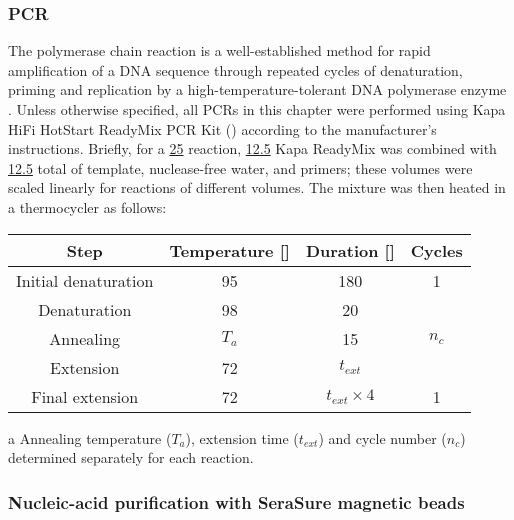\subsubsection{PCR}
\label{sec:methods_molec_standard_pcr}

The polymerase chain reaction is a well-established method for rapid amplification of a DNA sequence through repeated cycles of denaturation, priming and replication by a high-temperature-tolerant DNA polymerase enzyme \parencite{paul2010hotstartpcr}. Unless otherwise specified, all PCRs in this chapter were performed using  Kapa HiFi HotStart ReadyMix PCR Kit () according to the manufacturer's instructions. Briefly, for a \ul{25} reaction, \ul{12.5} Kapa ReadyMix was combined with \ul{12.5} total of template, nuclease-free water, and primers; these volumes were scaled linearly for reactions of different volumes. The mixture was then heated in a thermocycler as follows:

\begin{center}
\begin{threeparttable}
\begin{tabular}{cccc}\toprule
\textbf{Step} & \textbf{Temperature [\degC{}]} & \textbf{Duration [\secs{}]} & \textbf{Cycles}\\\midrule
Initial denaturation & 95 & 180 & 1 \\\midrule
Denaturation & 98 & 20 & \multirow{3}{*}{$n_c$\tnote{a}}\\
Annealing & $T_a$\tnote{a} \tnote{} & 15 & \\
Extension & 72 & $t_{ext}$\tnote{a} & \\\midrule
Final extension & 72 & $t_{ext} \times 4$\tnote{a} & 1\\
\bottomrule\end{tabular}
\begin{tablenotes}
\item[a] Annealing temperature ($T_a$), extension time ($t_{ext}$) and cycle number ($n_c$) determined separately for each reaction.
\end{tablenotes}
\end{threeparttable}
\end{center}

\subsubsection{Nucleic-acid purification with SeraSure magnetic beads}
\label{sec:methods_molec_standard_serasure}

